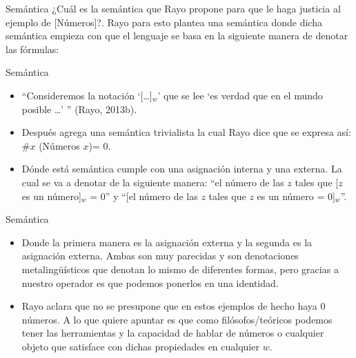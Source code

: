 \documentclass{beamer}
\begin{document}
      \begin{frame}{Semántica}
        ¿Cuál es la semántica que Rayo propone para 
        que le haga justicia al ejemplo de [Números]?. Rayo 
        para esto plantea una semántica donde dicha semántica 
        empieza con que el lenguaje se basa en la siguiente manera de 
        denotar las fórmulas: 
        \begin{block}{Semántica} \pause
          \begin{itemize}
            \item ``Consideremos la notación `[\dots]$_w$'
            que se lee `es verdad que en el mundo posible \dots' '' (Rayo, 2013b).

            \item Después agrega una semántica trivialista 
            la cual Rayo dice que se expresa así: \#$x$ (Números $x$)= 0.

            \item Dónde está semántica cumple con una asignación interna y una externa.
            La cual se va a denotar de la siguiente manera: ``el número de 
            las $z$ tales que [$z$ es un número]$_w$ = 0'' y ``[el número de 
            las $z$ tales que $z$ es un número = 0]$_w$''.
          \end{itemize}
        \end{block} 
      \end{frame}
      \begin{frame}{Semántica}
        \begin{itemize}
          \item [] Donde la primera manera es la asignación externa y la segunda 
          es la asignación externa. Ambas son muy parecidas y son 
          denotaciones metalingü\'isticos que denotan lo mismo de diferentes 
          formas, pero gracias a nuestro operador es que podemos 
          ponerlos en una identidad.

          \item[] Rayo aclara que no se 
          presupone que en estos ejemplos de hecho haya 0 números. 
          A lo que quiere apuntar es que como filósofos/teóricos 
          podemos tener las herramientas y la capacidad de hablar de números 
          o cualquier objeto que satisface con dichas propiedades en cualquier
          $w$.
        \end{itemize}
      \end{frame}
\end{document}
